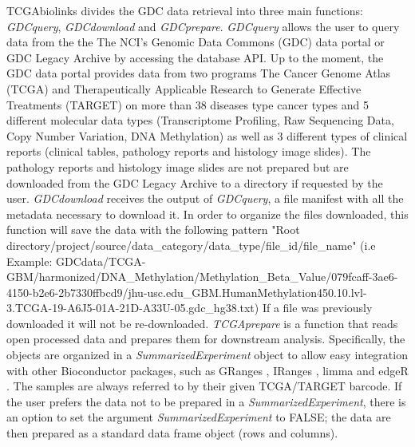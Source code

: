 TCGAbiolinks divides the GDC data retrieval into three main functions: \textit{GDCquery}, \textit{GDCdownload}
and \textit{GDCprepare}.
\textit{GDCquery} allows the user to query data from the the The NCI's Genomic Data Commons (GDC) data portal or GDC Legacy Archive by accessing the database API. Up to the moment, the GDC data portal provides data from two programs The Cancer Genome Atlas (TCGA) and Therapeutically Applicable Research to Generate Effective Treatments (TARGET)  on more
than 38 diseases type cancer types and 5 different molecular data types (Transcriptome Profiling, Raw Sequencing Data, Copy Number Variation, DNA Methylation) as well as 3 different types of clinical reports (clinical tables, pathology reports and histology image slides). The pathology
reports and histology image slides are not prepared
but are downloaded from the GDC Legacy Archive to a directory if requested by the user. \textit{GDCdownload} receives the output of \textit{GDCquery}, a file manifest with all the metadata necessary to download it. In order to organize the files downloaded, this function will save the data with the following pattern "Root directory/project/source/data\_category/data\_type/file\_id/file\_name" (i.e Example: GDCdata/TCGA-GBM/harmonized/DNA\_Methylation/Methylation\_Beta\_Value/079fcaff-3ae6-4150-b2e6-2b7330ffbcd9/jhu-usc.edu\_GBM.HumanMethylation450.10.lvl-3.TCGA-19-A6J5-01A-21D-A33U-05.gdc\_hg38.txt)
If a file was
previously downloaded it will not be re-downloaded. \textit{TCGAprepare} is a function that reads open processed data and prepares them for downstream analysis. Specifically, the objects are organized in a \textit{SummarizedExperiment}
object to allow easy integration
with other Bioconductor packages, such as GRanges \cite{lawrence2013software},
IRanges \cite{lawrence2013software}, limma \cite{ritchie2015limma} and edgeR \cite{robinson2010edger}. The samples are
always referred to by their given TCGA/TARGET barcode. If the user prefers the data not to be prepared in a \textit{SummarizedExperiment},
there is an option to set the argument \textit{SummarizedExperiment}
to FALSE; the data are then prepared as
a standard data frame object (rows and columns).

